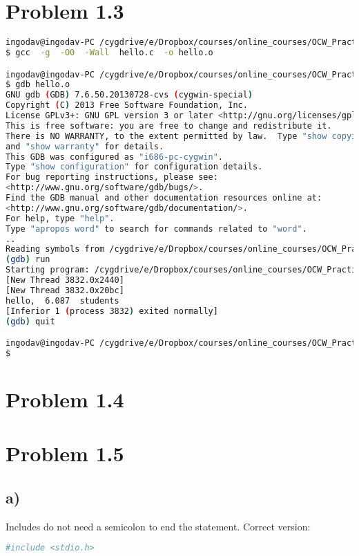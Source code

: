 \documentclass[12pt]{article}
\begin{document}
\section*{Problem 1.3}

\begin{lstlisting}[frame=single, language=bash, breaklines=true]
ingodav@ingodav-PC /cygdrive/e/Dropbox/courses/online_courses/OCW_Practical_Programming_in_C/problemSet1
$ gcc  -g  -O0  -Wall  hello.c  -o hello.o

ingodav@ingodav-PC /cygdrive/e/Dropbox/courses/online_courses/OCW_Practical_Programming_in_C/problemSet1
$ gdb hello.o
GNU gdb (GDB) 7.6.50.20130728-cvs (cygwin-special)
Copyright (C) 2013 Free Software Foundation, Inc.
License GPLv3+: GNU GPL version 3 or later <http://gnu.org/licenses/gpl.html>
This is free software: you are free to change and redistribute it.
There is NO WARRANTY, to the extent permitted by law.  Type "show copying"
and "show warranty" for details.
This GDB was configured as "i686-pc-cygwin".
Type "show configuration" for configuration details.
For bug reporting instructions, please see:
<http://www.gnu.org/software/gdb/bugs/>.
Find the GDB manual and other documentation resources online at:
<http://www.gnu.org/software/gdb/documentation/>.
For help, type "help".
Type "apropos word" to search for commands related to "word".
..
Reading symbols from /cygdrive/e/Dropbox/courses/online_courses/OCW_Practical_Programming_in_C/problemSet1/hello.o...done.
(gdb) run
Starting program: /cygdrive/e/Dropbox/courses/online_courses/OCW_Practical_Programming_in_C/problemSet1/hello.o
[New Thread 3832.0x2440]
[New Thread 3832.0x20bc]
hello,  6.087  students
[Inferior 1 (process 3832) exited normally]
(gdb) quit

ingodav@ingodav-PC /cygdrive/e/Dropbox/courses/online_courses/OCW_Practical_Programming_in_C/problemSet1
$
\end{lstlisting}

\section*{Problem 1.4}


\section*{Problem 1.5}
\subsection*{a)}
Includes do not need a semicolon to end the statement. Correct version:
\begin{lstlisting}[frame=single, language=bash, breaklines=true]
#include <stdio.h>
\end{lstlisting}
\end{document}
